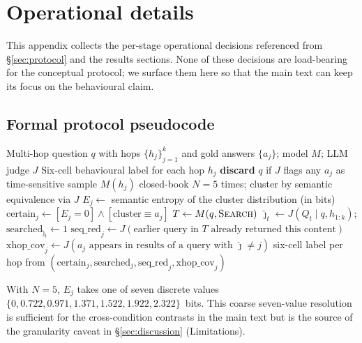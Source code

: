\documentclass[10pt,letterpaper]{article}
\begin{document}
\section{Operational details}\label{app:operational}

This appendix collects the per-stage operational decisions referenced from \S\ref{sec:protocol}
and the results sections. None of these decisions are load-bearing for the conceptual
protocol; we surface them here so that the main text can keep its focus on the
behavioural claim.

\subsection{Formal protocol pseudocode}\label{app:operational:algorithm}

\begin{algorithm}[H]
\caption{Per-hop search-calibration protocol}
\label{alg:protocol}
\begin{algorithmic}[1]
\Require Multi-hop question $q$ with hops $\{h_j\}_{j=1}^{k}$ and gold answers $\{a_j\}$;
         model $M$; LLM judge $J$
\Ensure  Six-cell behavioural label for each hop $h_j$
\State \textbf{discard} $q$ if $J$ flags any $a_j$ as time-sensitive 
 
  \State sample $M(h_j)$ closed-book $N{=}5$ times; cluster by semantic equivalence via $J$
  \State $E_j \gets$ semantic entropy of the cluster distribution (in bits)
  \State $\mathrm{certain}_j \gets [E_j = 0] \wedge [\text{cluster}\equiv a_j]$
\EndFor
\State $T \gets M(q,\textsc{Search})$ 
 
  \State $\hat{\jmath}_t \gets J(Q_t \mid q, h_{1{:}k})$;\quad
         $\mathrm{searched}_{\hat{\jmath}_t} \gets 1$
\EndFor
{} 
  \State $\mathrm{seq\_red}_j \gets J(\text{earlier query in $T$ already returned this content})$
  \State $\mathrm{xhop\_cov}_j \gets J(\text{$a_j$ appears in results of a query with }\hat{\jmath}\neq j)$
\EndFor
\State \Return six-cell label per hop from $(\mathrm{certain}_j,\mathrm{searched}_j,
        \mathrm{seq\_red}_j,\mathrm{xhop\_cov}_j)$
\end{algorithmic}
\end{algorithm}

With $N{=}5$, $E_j$ takes one of seven discrete values $\{0, 0.722, 0.971, 1.371,
1.522, 1.922, 2.322\}$~bits. This coarse seven-value resolution is sufficient for the
cross-condition contrasts in the main text but is the source of the granularity caveat
in \S\ref{sec:discussion} (Limitations).
\end{document}
